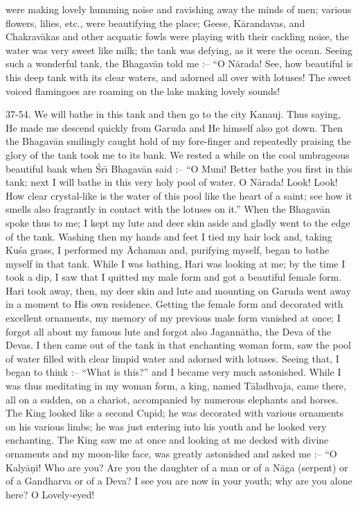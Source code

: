 were making lovely humming noise and ravishing away the minds of men; various flowers, lilies, etc., were beautifying the place; Geese, K\=arandavas, and Chakrav\=akas and other acquatic fowls were playing with their cackling noise, the water was very sweet like milk; the tank was defying, as it were the ocean. Seeing such a wonderful tank, the Bhagav\=an told me :-- ``O N\=arada! See, how beautiful is this deep tank with its clear waters, and adorned all over with lotuses! The sweet voiced flamingoes are roaming on the lake making lovely sounds!

37-54. We will bathe in this tank and then go to the city Kanauj. Thus saying, He made me descend quickly from Garuda and He himself also got down. Then the Bhagav\=an smilingly caught hold of my fore-finger and repeatedly praising the glory of the tank took me to its bank. We rested a while on the cool umbrageous beautiful bank when \'Sr\={\i} Bhagav\=an said :-- ``O Muni! Better bathe you first in this tank; next I will bathe in this very holy pool of water. O N\=arada! Look! Look! How clear crystal-like is the water of this pool like the heart of a saint; see how it smells also fragrantly in contact with the lotuses on it.'' When the Bhagav\=an spoke thus to me; I kept my lute and deer skin aside and gladly went to the edge of the tank. Washing then my hands and feet I tied my hair lock and, taking Ku\'sa grass, I performed my \=Achaman and, purifying myself, began to bathe myself in that tank. While I was bathing, Hari was looking at me; by the time I took a dip, I saw that I quitted my male form and got a beautiful female form. Hari took away, then, my deer skin and lute and mounting on Garuda went away in a moment to His own residence. Getting the female form and decorated with excellent ornaments, my memory of my previous male form vanished at once; I forgot all about my famous lute and forgot also Jagann\=atha, the Deva of the Devas. I then came out of the tank in that enchanting woman form, saw the pool of water filled with clear limpid water and adorned with lotuses. Seeing that, I began to think :-- ``What is this?'' and I became very much astonished. While I was thus meditating in my woman form, a king, named T\=aladhvaja, came there, all on a sudden, on a chariot, accompanied by numerous elephants and horses. The King looked like a second Cupid; he was decorated with various ornaments on his various limbs; he was just entering into his youth and he looked very enchanting. The King saw me at once and looking at me decked with divine ornaments and my moon-like face, was greatly astonished and asked me :-- ``O Kaly\=a\d{n}i! Who are you? Are you the daughter of a man or of a N\=aga (serpent) or of a Gandharva or of a Deva? I see you are now in your youth; why are you alone here? O Lovely-eyed!

